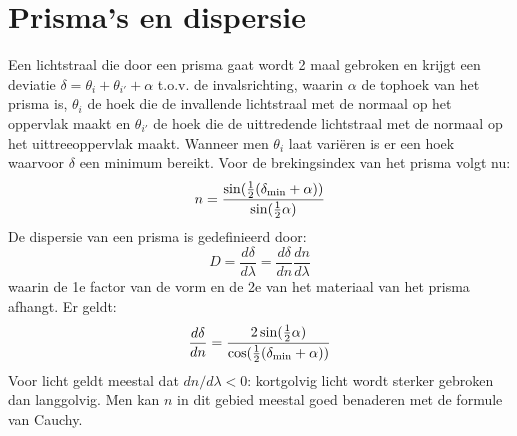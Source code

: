 \section{Prisma's en dispersie}
Een lichtstraal die door een prisma gaat wordt 2 maal gebroken en krijgt een
deviatie $\delta=\theta_i+\theta_{i'}+\alpha$ t.o.v. de invalsrichting,
waarin $\alpha$ de tophoek van het prisma is, $\theta_i$ de hoek die de
invallende lichtstraal met de normaal op het oppervlak maakt en $\theta_{i'}$
de hoek die de uittredende lichtstraal met de normaal op het uittreeoppervlak
maakt. Wanneer men $\theta_i$ laat vari\"eren is er een hoek waarvoor $\delta$
een minimum bereikt. Voor de brekingsindex van het prisma volgt nu:
\[
n=\frac{\sin(\mbox{$\frac{1}{2}$}(\delta_{\rm min}+\alpha))}{\sin(\mbox{$\frac{1}{2}$}\alpha)}
\]
De dispersie van een prisma is gedefinieerd door:
\[
D=\frac{d\delta}{d\lambda}=\frac{d\delta}{dn}\frac{dn}{d\lambda}
\]
waarin de 1e factor van de vorm en de 2e van het materiaal van het prisma
afhangt. Er geldt:
\[
\frac{d\delta}{dn}=\frac{2\sin(\mbox{$\frac{1}{2}$}\alpha)}{\cos(\mbox{$\frac{1}{2}$}(\delta_{\rm min}+\alpha))}
\]
Voor licht geldt meestal dat $dn/d\lambda<0$: kortgolvig licht wordt sterker
gebroken dan langgolvig. Men kan $n$ in dit gebied meestal goed benaderen met
de formule van Cauchy.

